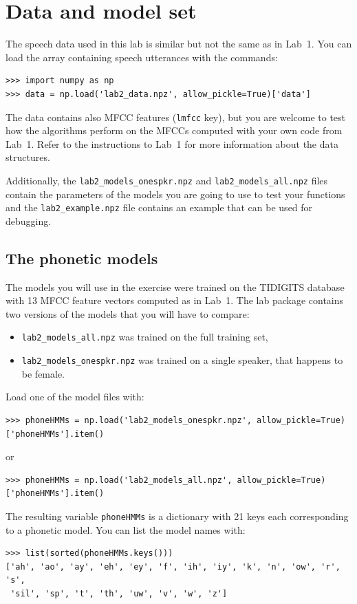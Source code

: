 \documentclass{nada-ten}
\begin{document}
\section{Data and model set}
The speech data used in this lab is similar but not the same as in Lab~1. You can load the  array containing speech utterances with the commands:
\begin{verbatim}
>>> import numpy as np
>>> data = np.load('lab2_data.npz', allow_pickle=True)['data']
\end{verbatim}
The data contains also MFCC features (\texttt{lmfcc} key), but you are welcome to test how the algorithms perform on the MFCCs computed with your own code from Lab~1. Refer to the instructions to Lab~1 for more information about the data structures.

Additionally, the \texttt{lab2\_models\_onespkr.npz} and \texttt{lab2\_models\_all.npz} files contain the parameters of the models you are going to use to test your functions and the \texttt{lab2\_example.npz} file contains an example that can be used for debugging.

\subsection{The phonetic models}
The models you will use in the exercise were trained on the TIDIGITS database with 13 MFCC feature vectors computed as in Lab~1.
The lab package contains two versions of the models that you will have to compare:
\begin{itemize}
\item \texttt{lab2\_models\_all.npz} was trained on the full training set,
\item \texttt{lab2\_models\_onespkr.npz} was trained on a single speaker, that happens to be female.
\end{itemize}

Load one of the model files with:
\begin{verbatim}
>>> phoneHMMs = np.load('lab2_models_onespkr.npz', allow_pickle=True)['phoneHMMs'].item()
\end{verbatim}
or
\begin{verbatim}
>>> phoneHMMs = np.load('lab2_models_all.npz', allow_pickle=True)['phoneHMMs'].item()
\end{verbatim}
The resulting variable \texttt{phoneHMMs} is a dictionary with 21 keys each corresponding to a phonetic model. You can list the model names with:
\begin{verbatim}
>>> list(sorted(phoneHMMs.keys()))
['ah', 'ao', 'ay', 'eh', 'ey', 'f', 'ih', 'iy', 'k', 'n', 'ow', 'r', 's',
 'sil', 'sp', 't', 'th', 'uw', 'v', 'w', 'z']
\end{verbatim}
\end{document}
